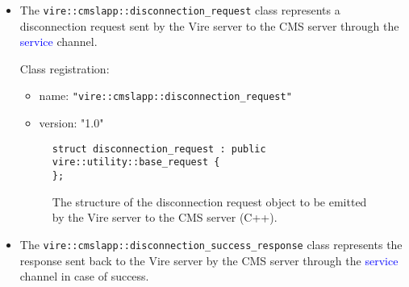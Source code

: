 \begin{itemize}

\item  The  \texttt{vire::cmslapp::disconnection\_request}  class
  represents a  disconnection request sent  by the Vire server  to the
  CMS server through the \textcolor{blue}{service} channel.

\begin{center}
\end{center}

\noindent Class registration:
\begin{itemize}
\item name: \texttt{"vire::cmslapp::disconnection\_request"}
\item version: "1.0"
\end{itemize}

\begin{figure}[h]
\vskip 10pt
\small
\begin{Verbatim}[frame=single,xleftmargin=0.cm,label=\fbox{C++}]
struct disconnection_request : public vire::utility::base_request {
};
\end{Verbatim}
\normalsize
\caption{The structure of the disconnection  request object to be emitted
  by the Vire server to the CMS server (C++).}
\label{fig-app-payload-disconnection_request}
\end{figure}



\item  The  \texttt{vire::cmslapp::disconnection\_success\_response}
  class represents  the response sent back  to the Vire server  by the
  CMS server through the  \textcolor{blue}{service} channel in case of
  success.


\end{itemize}
